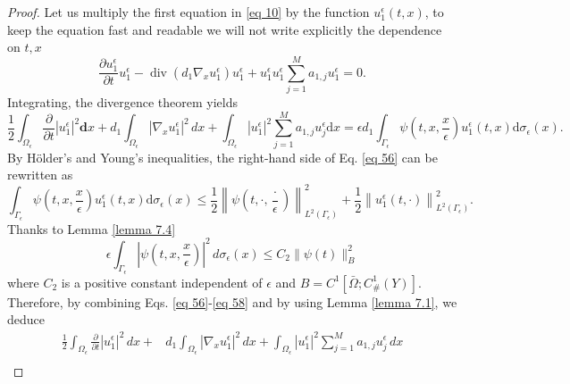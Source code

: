 \begin{proof}
Let us multiply the first equation in \eqref{eq 10} by the function $u_{1}^{\epsilon}(t, x)$, to keep the equation fast and readable we will not write explicitly the dependence on $t,x$
$$
\frac{\partial u_{1}^{\epsilon}}{\partial t}u_{1}^{\epsilon}-\operatorname{div}\left(d_{1} \nabla_{x} u_{1}^{\epsilon}\right)u_{1}^{\epsilon}+u_{1}^{\epsilon}u_{1}^{\epsilon} \sum_{j=1}^{M} a_{1, j} u_{1}^{\epsilon}=0.
$$
Integrating, the divergence theorem yields
\begin{equation}
\frac{1}{2}\int_{\Omega_{\epsilon}} \frac{\partial}{\partial t}\left|u_{1}^{\epsilon}\right|^{2} \mathbf{d} x+ d_{1} \int_{\Omega_{\epsilon}}\left|\nabla_{x} u_{1}^{\epsilon}\right|^{2} \, d  x+\int_{\Omega_{\epsilon}}\left|u_{1}^{\epsilon}\right|^{2} \sum_{j=1}^{M} a_{1, j} u_{j}^{\epsilon} \mathrm{d} x =\epsilon d_{1} \int_{\Gamma_{\epsilon}} \psi\left(t, x, \frac{x}{\epsilon}\right) u_{1}^{\epsilon}(t, x) \mathrm{d} \sigma_{\epsilon}(x).
\label{eq 56}\end{equation}
By Hölder's and Young's inequalities, the right-hand side of Eq. \eqref{eq 56} can be rewritten as
\begin{equation}
  \int_{\Gamma_{\epsilon}} \psi\left(t, x, \frac{x}{\epsilon}\right) u_{1}^{\epsilon}(t, x) \mathrm{d} \sigma_{\epsilon}(x) \leq \frac{1}{2}\left\|\psi\left(t, \cdot, \frac{\cdot}{\epsilon}\right)\right\|_{L^{2}\left(\Gamma_{\epsilon}\right)}^{2}+\frac{1}{2}\left\|u_{1}^{\epsilon}(t, \cdot)\right\|_{L^{2}\left(\Gamma_{\epsilon}\right)}^{2}.
\label{eq 57}\end{equation}
Thanks to Lemma \eqref{lemma 7.4}
\begin{equation}
  \epsilon \int_{\Gamma_{\epsilon}}\left|\psi\left(t, x, \frac{x}{\epsilon}\right)\right|^{2} \, d  \sigma_{\epsilon}(x) \leq C_{2}\|\psi(t)\|_{B}^{2}
\label{eq 58}\end{equation}
where $C_{2}$ is a positive constant independent of $\epsilon$ and $B=C^{1}\left[\bar{\Omega} ; C_{\#}^{1}(Y)\right]$. Therefore, by combining Eqs. \eqref{eq 56}-\eqref{eq 58} and by using Lemma \eqref{lemma 7.1}, we deduce
\begin{equation*}
\begin{aligned}
    \frac{1}{2} \int_{\Omega_{\epsilon}} \frac{\partial}{\partial t}\left|u_{1}^{\epsilon}\right|^{2} \, {d} x+& d_{1} \int_{\Omega_{\epsilon}}\left|\nabla_{x} u_{1}^{\epsilon}\right|^{2} \, {d} x+\int_{\Omega_{\epsilon}}\left|u_{1}^{\epsilon}\right|^{2} \sum_{j=1}^{M} a_{1, j} u_{j}^{\epsilon} \, {d} x\\

\end{aligned}
\end{equation*}
\end{proof}
